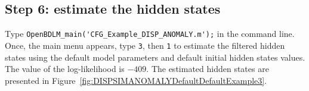 \subsection{Step 6: estimate the hidden states}

Type \colorbox{light-gray}{\lstinline[basicstyle = \mlttfamily \small, backgroundcolor = \color{light-gray}]!OpenBDLM_main('CFG_Example_DISP_ANOMALY.m');!} in the \MATLAB{} command line.
Once, the main menu appears, type  \colorbox{light-gray}{\lstinline[basicstyle = \mlttfamily \small, backgroundcolor = \color{light-gray}]!3!}, then \colorbox{light-gray}{\lstinline[basicstyle = \mlttfamily \small, backgroundcolor = \color{light-gray}]!1!} to estimate the filtered hidden states using the default model parameters and default initial hidden states values.
The value of the log-likelihood is $-409$.
The estimated hidden states are presented in Figure~\ref{fig:DISPSIMANOMALYDefaultDefaultExample3}.

